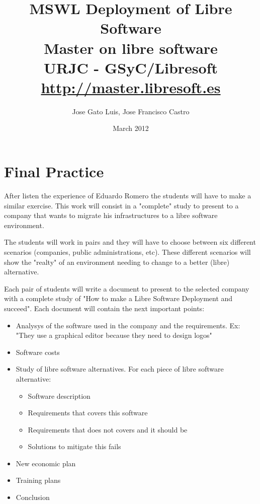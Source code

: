 \documentclass[a4paper]{article}
\title{MSWL Deployment of Libre Software \\
Master on libre software \\
URJC - GSyC/Libresoft \\
\url{http://master.libresoft.es}}
\author{Jose Gato Luis, Jose Francisco Castro}
\date{March 2012}
\begin{document}
\maketitle



\section { Final Practice}

After listen the experience of Eduardo Romero the students will have to make a similar exercise. This work will consist in a "complete" study to present to a company that wants to migrate his infrastructures to a libre software environment. 

The students will work in pairs and they will have to choose between six different scenarios (companies, public administrations, etc). These different scenarios will show the "realty" of an environment needing to change to a better (libre) alternative. 

Each pair of students will write a document to present to the selected company with a complete study of "How to make a Libre Software Deployment and succeed". Each document will contain the next important points:

\begin{itemize}
\item Analysys of the software used in the company and the requirements. Ex: "They use a graphical editor because they need to design logos"
\item Software costs
\item Study of libre software alternatives. For each piece of libre software alternative:
	\begin{itemize}
	\item Software description
	\item Requirements that covers this software
	\item Requirements that does not covers and it should be
	\item Solutions to mitigate this fails
	\end{itemize}
\item New economic plan
\item Training plans 
\item Conclusion

\end{itemize}


\end{document}
